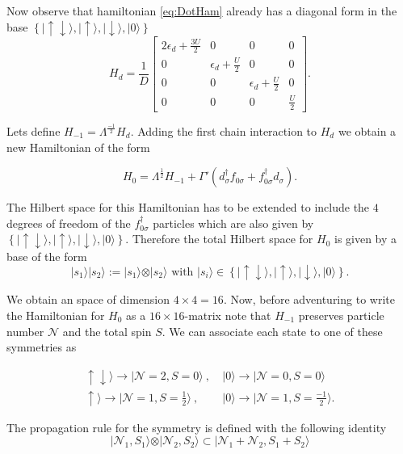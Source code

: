 Now observe that hamiltonian \ref{eq:DotHam} already has a
diagonal form in the base $\left\{ \vert\uparrow\!\downarrow\rangle,\vert\uparrow\rangle,\vert\downarrow\rangle,\vert0\rangle\right\} $
\[
H_{d}=\frac{1}{D}\left[\begin{array}{cccc}
2\epsilon_{d}+\frac{3U}{2} & 0 & 0 & 0\\
0 & \epsilon_{d}+\frac{U}{2} & 0 & 0\\
0 & 0 & \epsilon_{d}+\frac{U}{2} & 0\\
0 & 0 & 0 & \frac{U}{2}
\end{array}\right].
\]


Lets define $H_{-1}=\Lambda^{\frac{-1}{2}}H_{d}.$ Adding the first
chain interaction to $H_{d}$ we obtain a new Hamiltonian of the form 

\begin{equation}
H_{0}=\Lambda^{\frac{1}{2}}H_{-1}+\Gamma'\left(d_{\sigma}^{\dagger}f_{0\sigma}+f_{0\sigma}^{\dagger}d_{\sigma}\right).\label{eq:H0fromH-1}
\end{equation}


The Hilbert space for this Hamiltonian has to be extended to include
the $4$ degrees of freedom of the $f_{0\sigma}^{\dagger}$ particles
which are also given by $\left\{ \vert\uparrow\!\downarrow\rangle,\vert\uparrow\rangle,\vert\downarrow\rangle,\vert0\rangle\right\} $.
Therefore the total Hilbert space for $H_{0}$ is given by a base
of the form 
\[
\vert s_{1}\rangle\vert s_{2}\rangle:=\vert s_{1}\rangle\otimes\vert s_{2}\rangle\mbox{ with }\vert s_{i}\rangle\in\left\{ \vert\uparrow\!\downarrow\rangle,\vert\uparrow\rangle,\vert\downarrow\rangle,\vert0\rangle\right\} .
\]


We obtain an space of dimension $4\times4=16.$ Now, before adventuring
to write the Hamiltonian for $H_{0}$ as a $16\times16$-matrix note
that $H_{-1}$ preserves particle number $\mathcal{N}$ and the total spin $S$.
We can associate each state to one of these symmetries as 

\begin{align}
\uparrow\downarrow\rangle\longrightarrow\vert \mathcal{N}=2,S=0\rangle\ ,& \ \vert0\rangle\longrightarrow\vert \mathcal{N}=0,S=0\rangle \\ 
\uparrow\rangle\longrightarrow\vert \mathcal{N}=1,S=\frac{1}{2}\rangle\ ,& \ \vert 0\rangle\longrightarrow\vert \mathcal{N}=1,S=\frac{-1}{2}\rangle.
\end{align}

The propagation rule for the symmetry is defined with the following identity 
\begin{equation}
  \vert \mathcal{N}_{1},S_{1}\rangle\otimes\vert \mathcal{N}_{2},S_{2}\rangle\subset\vert \mathcal{N}_{1}+\mathcal{N}_{2},S_{1}+S_{2}\rangle \label{eq:PropRuleQD}
\end{equation} 
  

